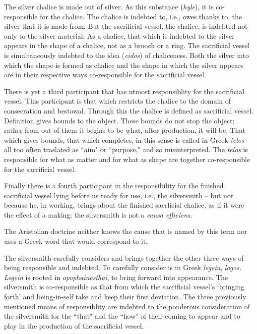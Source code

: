 \documentclass[12pt]{article}
\begin{document}
The silver chalice is made out of silver. As this substance (\textit{hyle}), it is co-responsible for the chalice. The chalice is indebted to, i.e., owes thanks to, the silver that it is made from. But the sacrificial vessel, the chalice, is indebted not only to the silver material. As a chalice, that which is indebted to the silver appears in the shape of a chalice, not as a brooch or a ring. The sacrificial vessel is simultaneously indebted to the idea (\textit{eidos}) of chaliceness. Both the silver into which the shape is formed as chalice and the shape in which the silver appears are in their respective ways co-responsible for the sacrificial vessel.

There is yet a third participant that has utmost responsiblity for the sacrificial vessel. This participant is that which restricts the chalice to the domain of consecration and bestowal. Through this the chalice is defined as sacrificial vessel. Definition gives bounds to the object. These bounds do not stop the object; rather from out of them it begins to be what, after production, it will be. That which gives bounds, that which completes, in this sense is called in Greek \textit{telos} -- all too often traslated as ``aim" or ``purpose," and so misinterpreted. The \textit{telos} is responsible for what as matter and for what as shape are together co-responsible for the sacrificial vessel.

Finally there is a fourth participant in the responsibility for the finished sacrificial vessel lying before us ready for use, i.e., the silversmith -- but not because he, in working, brings about the finished sacrficial chalice, as if it were the effect of a making; the silversmith is not a \textit{causa efficiens}.

The Aristolian doctrine neither knows the cause that is named by this term nor uses a Greek word that would correspond to it.

The silversmith carefully considers and brings together the other three ways of being responsible and indebted. To carefully consider is in Greek \textit{legein}, \textit{logos}. \textit{Legein} is rooted in \textit{apophainesthai}, to bring forward into appearance. The silversmith is co-responsible as that from which the sacrificial vessel's `bringing forth' and being-in-self take and keep their first deviation. The three previously mentioned means of responsiblity are indebted to the ponderous consideration of the silversmith for the ``that" and the ``how" of their coming to appear and to play in the production of the sacrificial vessel.
\end{document}
